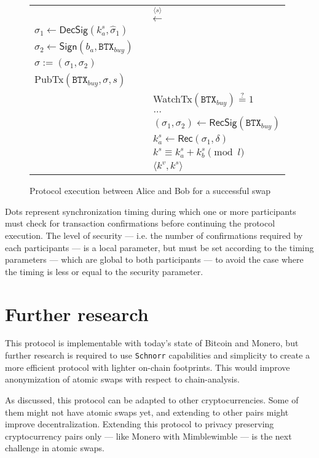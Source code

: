 \documentclass{llncs}
\newcommand{\BTX}{\texttt{BTX}}
\newcommand{\DecSig}{\textsf{DecSig}}
\newcommand{\Sign}{\textsf{Sign}}
\newcommand{\Rec}{\textsf{Rec}}
\newcommand{\hatsigma}{\hat{\sigma}}
\newcommand{\PubTx}{\textsf{PubTx}}
\newcommand{\WatchTx}{\textsf{WatchTx}}
\newcommand{\RecSig}{\textsf{RecSig}}
\begin{document}
\begin{figure}[H]
\begin{table}[H]
{\begin{tabular}{ | l c l | }
          \multicolumn{3}{|c|}{$\xleftarrow{\langle s \rangle}$} \\

          $\sigma_1 \gets \DecSig(k^s_a, \hatsigma_1)$ & & \\
          $\sigma_2 \gets \Sign(b_a, \BTX_\textit{buy})$ & & \\
          $\sigma := (\sigma_1, \sigma_2)$ & & \\
          \PubTx$(\BTX_\textit{buy}, \sigma, s)$ & & \\

          & & \WatchTx$(\BTX_\textit{buy}) \stackrel{?}{=} 1$ \\
          \multicolumn{3}{|c|}{$\dots$} \\

          & & $(\sigma_1, \sigma_2) \gets \RecSig(\BTX_\textit{buy})$ \\
          & & $k^s_a \gets \Rec(\sigma_1, \delta)$ \\
          & & $k^s \equiv k^s_a + k^s_b \pmod l$ \\
          & & $\langle k^v, k^s \rangle$ \\
        \hline
      \end{tabular}}
    \end{table}
  \caption{Protocol execution between Alice and Bob for a successful swap}
  \label{fig:protocol}
\end{figure}

Dots represent synchronization timing during which one or more participants must check for transaction confirmations before continuing the protocol execution. The level of security --- i.e. the number of confirmations required by each participants --- is a local parameter, but must be set according to the timing parameters --- which are global to both participants --- to avoid the case where the timing is less or equal to the security parameter.

\section{Further research}
This protocol is implementable with today's state of Bitcoin and Monero, but further research is required to use \texttt{Schnorr} capabilities and simplicity to create a more efficient protocol with lighter on-chain footprints. This would improve anonymization of atomic swaps with respect to chain-analysis.

As discussed, this protocol can be adapted to other cryptocurrencies. Some of them might not have atomic swaps yet, and extending to other pairs might improve decentralization. Extending this protocol to privacy preserving cryptocurrency pairs only --- like Monero with Mimblewimble --- is the next challenge in atomic swaps.
\end{document}
